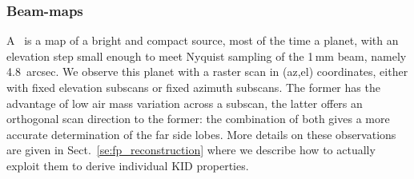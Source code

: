 \subsubsection{Beam-maps}

A \bm\ is a map of a bright and compact source, most of the time
a planet, with an elevation step small enough to meet Nyquist sampling of the
1\,mm beam, namely 4.8~arcsec. We observe this planet with a raster scan in
(az,el) coordinates, either with fixed elevation subscans or fixed azimuth
subscans. The former has the advantage of low air mass variation across a
subscan, the latter offers an orthogonal scan direction to the former: the
combination of both gives a more accurate determination of the far side
lobes. More details on these observations are given in
Sect.~\ref{se:fp_reconstruction} where we describe how to actually exploit them
to derive individual KID properties.


